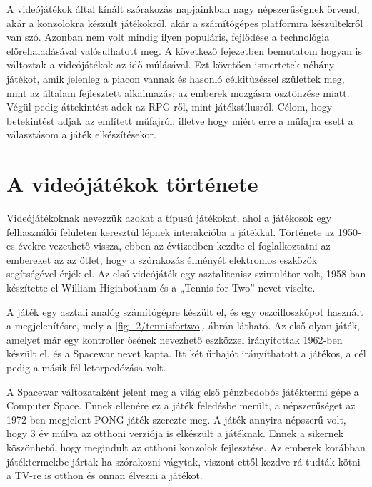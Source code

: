 
A videójátékok által kínált szórakozás napjainkban nagy népszerűségnek örvend, akár a konzolokra készült játékokról, akár a számítógépes platformra készültekről van szó.
Azonban nem volt mindig ilyen populáris, fejlődése a technológia előrehaladásával valósulhatott meg. 
A következő fejezetben bemutatom hogyan is változtak a videójátékok az idő múlásával. 
Ezt követően ismertetek néhány játékot, amik jelenleg a piacon vannak és hasonló célkitűzéssel születtek meg, mint az általam fejlesztett alkalmazás: az emberek mozgásra ösztönzése miatt. 
Végül pedig áttekintést adok az RPG-ről, mint játékstílusról. 
Célom, hogy betekintést adjak az említett műfajról, illetve hogy miért erre a műfajra esett a választásom a játék elkészítésekor. 


\section{A videójátékok története}
\label{videojatektortenet}


Videójátékoknak nevezzük azokat a típusú játékokat, ahol a játékosok egy felhasználói felületen keresztül lépnek interakcióba a játékkal. 
Története az 1950-es évekre vezethető vissza, ebben az évtizedben kezdte el foglalkoztatni az embereket az az ötlet, hogy a szórakozás élményét elektromos eszközök segítségével érjék el. 
Az első videójáték egy asztalitenisz szimulátor volt, 1958-ban készítette el William Higinbotham és a „Tennis for Two” nevet viselte. 


A játék egy asztali analóg számítógépre készült el, és egy oszcilloszkópot használt a megjelenítésre, mely a \ref{fig_2/tennisfortwo}. ábrán látható.  
Az első olyan játék, amelyet már egy kontroller ősének nevezhető eszközzel irányítottak 1962-ben készült el, és a Spacewar nevet kapta. 
Itt két űrhajót irányíthatott a játékos, a cél pedig a másik fél letorpedózása volt. 

A Spacewar változataként jelent meg a világ első pénzbedobós játéktermi gépe a Computer Space. 
Ennek ellenére ez a játék feledésbe merült, a népszerűséget az 1972-ben megjelent PONG játék szerezte meg. 
A játék annyira népszerű volt, hogy 3 év múlva az otthoni verziója is elkészült a játéknak. 
Ennek a sikernek köszönhető, hogy megindult az otthoni konzolok fejlesztése. 
Az emberek korábban játéktermekbe jártak ha szórakozni vágytak, viszont ettől kezdve rá tudták kötni a TV-re is otthon és onnan élvezni a játékot. 

